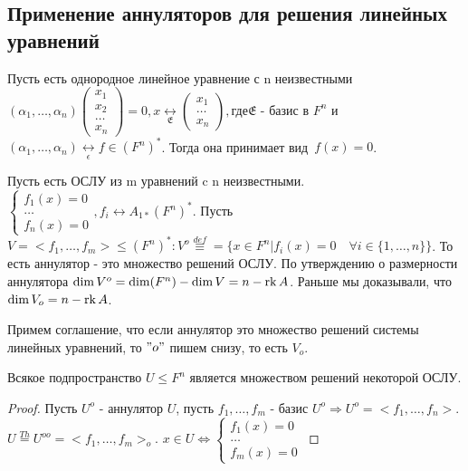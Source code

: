 \subsection{Применение аннуляторов для решения линейных уравнений}
\begin{definition}
	Пусть есть однородное линейное уравнение с n неизвестными \\ \((\alpha_1, \ldots, \alpha_n)\begin{pmatrix}
	x_1 \\ x_2 \\ \ldots \\ x_n
	\end{pmatrix} = 0, x\underset{\mathfrak{E}}{\longleftrightarrow} \begin{pmatrix}
	x_1 \\ \ldots \\ x_n
	\end{pmatrix},\text{где} \mathfrak{E}\) - базис в \(F^n\) и \((\alpha_1, \ldots, \alpha_n)\underset{\mathfrak{\epsilon}}{\longleftrightarrow} f\in (F^n)^*\). Тогда она принимает вид~\(f(x) = 0\). 
	
	Пусть есть ОСЛУ из m уравнений c n неизвестными. 
	\(\left\{\begin{gathered}
		f_1(x) = 0 \\ \ldots \\ f_n(x) = 0
	\end{gathered}\right., f_i\longleftrightarrow A_{1*}(F^n)^{*}\). Пусть \(V = <f_1, \ldots, f_m>\le (F^n)^*: V^o \overset{def}{\equiv} = \{x\in F^n | f_i(x) = 0 \quad \forall i\in \{1,\ldots, n\}\}\). То есть аннулятор - это множество решений ОСЛУ. 
	По утверждению о размерности аннулятора \(\dim V^o = \dim(F^n) - \dim V = n - \operatorname{rk} A\). Раньше мы доказывали, что \(\dim V_o = n - \operatorname{rk} A\).
\end{definition}
\begin{note}
	Примем соглашение, что если аннулятор это множество решений системы линейных уравнений, то \("o"\) пишем снизу, то есть \(V_o\).
\end{note}
\begin{proposition}
	Всякое подпространство \(U\le F^n\) является множеством решений некоторой ОСЛУ.
\end{proposition}
\begin{proof}
	Пусть \(U^o\) - аннулятор \(U\), пусть \(f_1, \ldots, f_m\) - базис \(U^o\Longrightarrow U^o = <f_1, \ldots, f_n>\). \(U\overset{Th}{=} U^{oo} = <f_1, \ldots, f_m>_o\). \(x\in U\Longleftrightarrow \left\{\begin{gathered}
		f_1(x) = 0 \\ \ldots \\ f_m(x) = 0
	\end{gathered}\right.\)
\end{proof}

